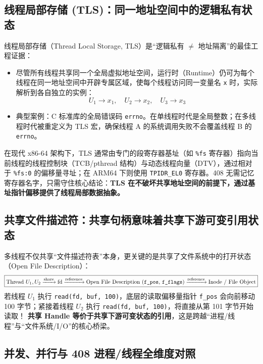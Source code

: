 \documentclass[11pt,a4paper]{ctexart}
\newcommand{\kw}[1]{\textbf{#1}}
\newcommand{\code}[1]{\texttt{#1}}
\begin{document}
\subsection{线程局部存储 (TLS)：同一地址空间中的逻辑私有状态}

线程局部存储（Thread Local Storage, TLS）是“逻辑私有 $\neq$ 地址隔离”的最佳工程证据：
\begin{itemize}
\item 尽管所有线程共享同一个全局虚拟地址空间，运行时（Runtime）仍可为每个线程在同一地址空间中开辟专属区域，使每个线程访问同一变量名 \code{x} 时，实际解析到各自独立的实例：
  \[
  U_1 \to x_1,\quad U_2 \to x_2,\quad U_3 \to x_3
  \]
\item 典型案例：C 标准库的全局错误码 \code{errno}。在单线程时代是全局整数；在多线程时代被重定义为 TLS 宏，确保线程 A 的系统调用失败不会覆盖线程 B 的 \code{errno}。
\end{itemize}

\begin{eng}
在现代 x86-64 架构下，TLS 通常由专门的段寄存器基址（如 \code{\%fs} 寄存器）指向当前线程的线程控制块（TCB/pthread 结构）与动态线程向量（DTV），通过相对于 \code{\%fs:0} 的偏移量寻址；在 ARM64 下则使用 \code{TPIDR\_EL0} 寄存器。408 无需记忆寄存器名字，只需守住核心结论：\kw{TLS 在不破坏共享地址空间的前提下，通过基址指针偏移提供了线程局部数据抽象。}
\end{eng}

\subsection{共享文件描述符：共享句柄意味着共享下游可变引用状态}

多线程不仅共享“文件描述符表”本身，更关键的是共享了文件系统中的打开状态（Open File Description）：
\[
\boxed{
\text{Thread } U_1, U_2
\xrightarrow{\text{share}}
\text{fd}
\xrightarrow{\text{reference}}
\text{Open File Description (\texttt{f\_pos}, \texttt{f\_flags})}
\xrightarrow{\text{reference}}
\text{Inode / File Object}
}
\]
若线程 $U_1$ 执行 \code{read(fd, buf, 100)}，底层的读取偏移量指针 \code{f\_pos} 会向前移动 100 字节；紧接着线程 $U_2$ 执行 \code{read(fd, buf, 100)}，将直接从第 101 字节开始读取！
\kw{共享 Handle 等价于共享下游可变状态的引用}，这是跨越“进程/线程”与“文件系统/I/O”的核心桥梁。

\subsection{并发、并行与 408 进程/线程全维度对照}
\end{document}
